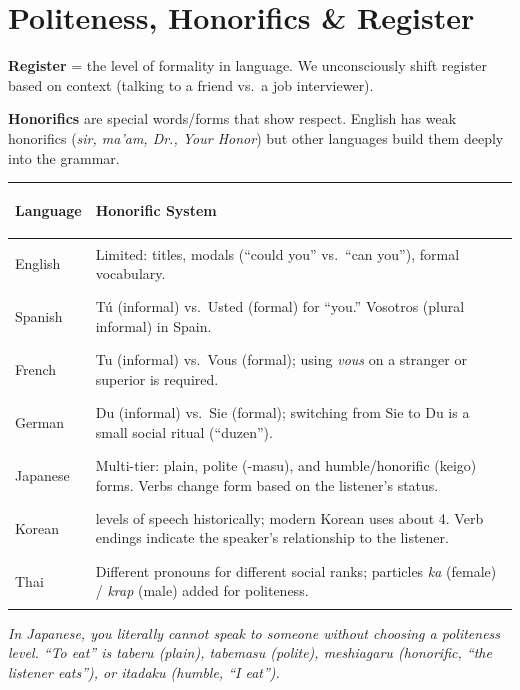 \documentclass[11pt, letterpaper]{article}
\begin{document}
\section*{Politeness, Honorifics \& Register}

\textbf{Register} = the level of formality in language. We unconsciously shift register based on context (talking to a friend vs.\ a job interviewer).

\textbf{Honorifics} are special words/forms that show respect. English has weak honorifics (\emph{sir, ma'am, Dr., Your Honor}) but other languages build them deeply into the grammar.

\noindent
{\renewcommand{\arraystretch}{1.5}
\begin{tabularx}{\textwidth}{>{\bfseries\raggedright\arraybackslash}p{2.5cm}
                              >{\raggedright\arraybackslash}X}
\toprule
\rowcolor{tableheadergrey}
\textbf{Language} & \textbf{Honorific System} \\
\midrule
\rowcolor{rowGr} English   & Limited: titles, modals (``could you'' vs.\ ``can you''), formal vocabulary. \\
\rowcolor{rowA}  Spanish   & T\'u (informal) vs.\ Usted (formal) for ``you.'' Vosotros (plural informal) in Spain. \\
\rowcolor{rowGr} French    & Tu (informal) vs.\ Vous (formal); using \emph{vous} on a stranger or superior is required. \\
\rowcolor{rowA}  German    & Du (informal) vs.\ Sie (formal); switching from Sie to Du is a small social ritual (``duzen''). \\
\rowcolor{rowGr} Japanese  & Multi-tier: plain, polite (-masu), and humble/honorific (keigo) forms. Verbs change form based on the listener's status. \\
\rowcolor{rowA}  Korean    & 7 levels of speech historically; modern Korean uses about 4. Verb endings indicate the speaker's relationship to the listener. \\
\rowcolor{rowGr} Thai      & Different pronouns for different social ranks; particles \emph{ka} (female) / \emph{krap} (male) added for politeness. \\
\bottomrule
\end{tabularx}}

\textit{In Japanese, you literally cannot speak to someone without choosing a politeness level. ``To eat'' is \emph{taberu} (plain), \emph{tabemasu} (polite), \emph{meshiagaru} (honorific, ``the listener eats''), or \emph{itadaku} (humble, ``I eat'').}
\end{document}
